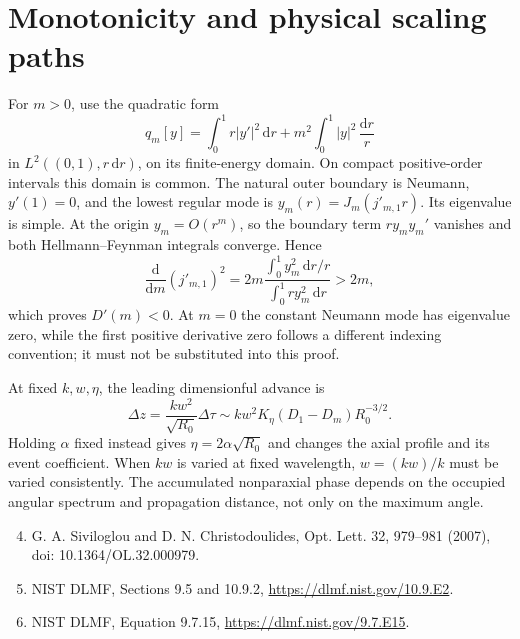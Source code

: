 \documentclass[11pt,a4paper]{article}
\begin{document}
\section{Monotonicity and physical scaling paths}
For $m>0$, use the quadratic form
\begin{equation}
q_m[y]=\int_0^1r|y'|^2\,\mathrm{d}r+m^2\int_0^1|y|^2\,\frac{\mathrm{d}r}{r}
\end{equation}
in $L^2((0,1),r\,\mathrm{d}r)$, on its finite-energy domain. On compact positive-order
intervals this domain is common. The natural outer boundary is Neumann,
$y'(1)=0$, and the lowest regular mode is
$y_m(r)=J_m(j'_{m,1}r)$. Its eigenvalue is simple. At the origin
$y_m=O(r^m)$, so the boundary term $r y_m y_m'$ vanishes and both
Hellmann--Feynman integrals converge. Hence
\begin{equation}
\frac{\mathrm{d}}{\mathrm{d}m}(j'_{m,1})^2
=2m\frac{\int_0^1y_m^2\,\mathrm{d}r/r}{\int_0^1r y_m^2\,\mathrm{d}r}>2m,
\end{equation}
which proves $D'(m)<0$. At $m=0$ the constant Neumann mode has eigenvalue
zero, while the first positive derivative zero follows a different indexing
convention; it must not be substituted into this proof.

At fixed $k,w,\eta$, the leading dimensionful advance is
\begin{equation}
\Delta z=\frac{kw^2}{\sqrt{R_0}}\Delta\tau
\sim kw^2 K_\eta(D_1-D_m)R_0^{-3/2}.
\end{equation}
Holding $\alpha$ fixed instead gives $\eta=2\alpha\sqrt{R_0}$ and changes
the axial profile and its event coefficient. When $kw$ is varied at fixed
wavelength, $w=(kw)/k$ must be varied consistently. The accumulated
nonparaxial phase depends on the occupied angular spectrum and propagation
distance, not only on the maximum angle.





\FloatBarrier




\begin{enumerate}\setcounter{enumi}{3}
\item G. A. Siviloglou and D. N. Christodoulides, Opt. Lett. 32, 979--981 (2007), \linebreak doi: 10.1364/OL.32.000979.
\item NIST DLMF, Sections 9.5 and 10.9.2, \url{https://dlmf.nist.gov/10.9.E2}.
\item NIST DLMF, Equation 9.7.15, \url{https://dlmf.nist.gov/9.7.E15}.
\end{enumerate}
\end{document}
